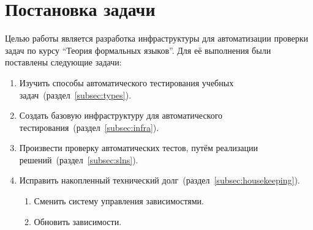 
\section{Постановка задачи}
\label{sec:task}

Целью работы является разработка инфраструктуры для автоматизации проверки задач по курсу \enquote{Теория формальных языков}.
Для её выполнения были поставлены следующие задачи:
\begin{enumerate}
    \item Изучить способы автоматического тестирования учебных задач~(раздел~\ref{subsec:types}).
    \item Создать базовую инфраструктуру для автоматического тестирования~(раздел~\ref{subsec:infra}).
    \item Произвести проверку автоматических тестов, путём реализации решений~(раздел~\ref{subsec:slns}).
    \item Исправить накопленный технический долг~(раздел~\ref{subsec:housekeeping}). 
          \begin{enumerate}
              \item Сменить систему управления зависимостями.
              \item Обновить зависимости.
          \end{enumerate}
\end{enumerate}
